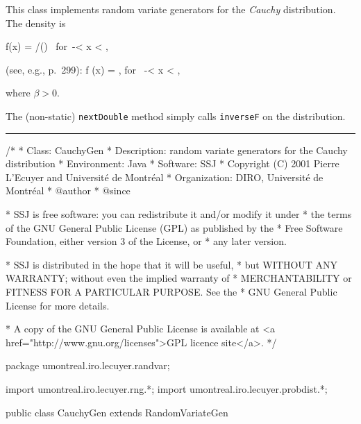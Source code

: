 
This class implements random variate generators for the {\em Cauchy\/} 
distribution. The density is
\begin{htmlonly}%
\eq
  f(x) = \beta/()
\mbox{ for }-\infty < x < \infty,
\endeq
\end{htmlonly}%
\begin{latexonly}%
(see, e.g., \cite {tJOH95a} p.\ 299):
\eq 
    f (x) = ,
             \qquad  \mbox{for } -\infty < x < \infty, 
\endeq
\end{latexonly}
where $\beta > 0$.

The (non-static) \texttt{nextDouble} method simply calls 
\texttt{inverseF} on the distribution.

\bigskip\hrule

\begin{code}
\begin{hide}
/*
 * Class:        CauchyGen
 * Description:  random variate generators for the Cauchy distribution
 * Environment:  Java
 * Software:     SSJ 
 * Copyright (C) 2001  Pierre L'Ecuyer and Université de Montréal
 * Organization: DIRO, Université de Montréal
 * @author       
 * @since

 * SSJ is free software: you can redistribute it and/or modify it under
 * the terms of the GNU General Public License (GPL) as published by the
 * Free Software Foundation, either version 3 of the License, or
 * any later version.

 * SSJ is distributed in the hope that it will be useful,
 * but WITHOUT ANY WARRANTY; without even the implied warranty of
 * MERCHANTABILITY or FITNESS FOR A PARTICULAR PURPOSE.  See the
 * GNU General Public License for more details.

 * A copy of the GNU General Public License is available at
   <a href="http://www.gnu.org/licenses">GPL licence site</a>.
 */
\end{hide}
package umontreal.iro.lecuyer.randvar;\begin{hide}
import umontreal.iro.lecuyer.rng.*;
import umontreal.iro.lecuyer.probdist.*;
\end{hide}

public class CauchyGen extends RandomVariateGen \begin{hide} {
   protected double alpha;
   protected double beta;
\end{hide}
\end{code}

